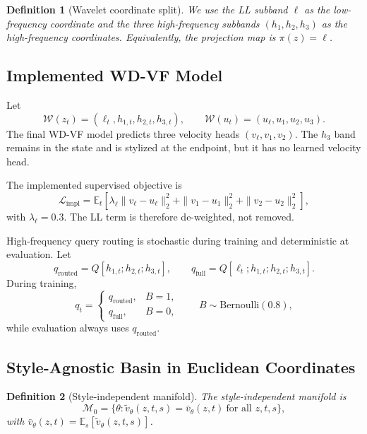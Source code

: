 \documentclass[10pt,letterpaper]{article}
\newtheorem*{sdefinition}{Definition}
\begin{document}
\begin{sdefinition}[Wavelet coordinate split]
We use the LL subband $\ell$ as the low-frequency coordinate and the three high-frequency subbands $(h_1,h_2,h_3)$ as the high-frequency coordinates. Equivalently, the projection map is $\pi(z)=\ell$.
\end{sdefinition}

\subsection{Implemented WD-VF Model}
\label{sec:implemented}

Let
\[
\mathcal W(z_t) = (\ell_t,h_{1,t},h_{2,t},h_{3,t}),
\qquad
\mathcal W(u_t) = (u_\ell,u_1,u_2,u_3).
\]
The final WD-VF model predicts three velocity heads $(v_\ell,v_1,v_2)$. The $h_3$ band remains in the state and is stylized at the endpoint, but it has no learned velocity head.

The implemented supervised objective is
\begin{equation}
\mathcal L_{\mathrm{impl}}
=
\mathbb E_t\!\left[
\lambda_\ell\|v_\ell-u_\ell\|_2^2
+
\|v_1-u_1\|_2^2
+
\|v_2-u_2\|_2^2
\right],
\label{eq:impl-loss}
\end{equation}
with $\lambda_\ell = 0.3$. The LL term is therefore de-weighted, not removed.

High-frequency query routing is stochastic during training and deterministic at evaluation. Let
\[
q_{\mathrm{routed}} = Q[h_{1,t};h_{2,t};h_{3,t}],
\qquad
q_{\mathrm{full}} = Q[\ell_t;h_{1,t};h_{2,t};h_{3,t}].
\]
During training,
\[
q_t =
\begin{cases}
q_{\mathrm{routed}}, & B=1,\\
q_{\mathrm{full}}, & B=0,
\end{cases}
\qquad
B \sim \mathrm{Bernoulli}(0.8),
\]
while evaluation always uses $q_{\mathrm{routed}}$.

\subsection{Style-Agnostic Basin in Euclidean Coordinates}
\label{sec:degeneration}

\begin{sdefinition}[Style-independent manifold]
The style-independent manifold is
\[
\mathcal M_0
=
\{\theta:\tilde v_\theta(z,t,s)=\bar v_\theta(z,t)\ \text{for all } z,t,s\},
\]
with $\bar v_\theta(z,t)=\mathbb E_s[\tilde v_\theta(z,t,s)]$.
\end{sdefinition}
\end{document}
